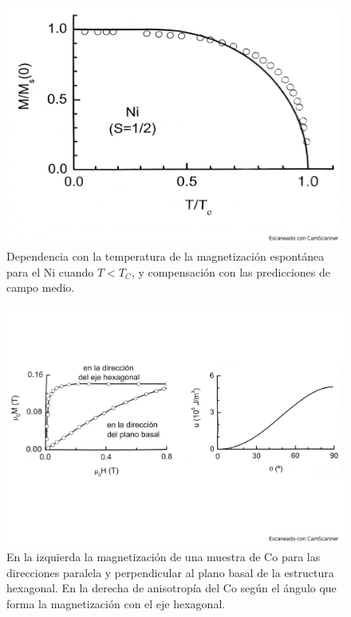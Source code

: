 \begin{figure}[h!] \centering
	\includegraphics[scale=0.35]{Cuerpo/Ch_10/Fotos libro 4.pdf}
	\caption{Dependencia con la temperatura de la magnetización espontánea para el Ni cuando $T<T_C$, y compensación con las predicciones de campo medio.}
	\label{Fig:10-04}
\end{figure}
\begin{figure}[h!] \centering
	\includegraphics[scale=0.35]{Cuerpo/Ch_10/Fotos libro 5.pdf}
	\caption{En la izquierda la magnetización de una muestra de  Co para las direcciones paralela y perpendicular al plano basal de la estructura hexagonal. En la derecha de anisotropía del Co según el ángulo que forma la magnetización con el eje hexagonal.}
	\label{Fig:10-05}
\end{figure}
